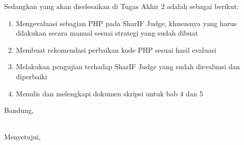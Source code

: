 \documentclass[a4paper,twoside]{article}
\begin{document}
	Sedangkan yang akan diselesaikan di Tugas Akhir 2 adalah sebagai berikut:
	\begin{enumerate}
		\item Mengevaluasi sebagian PHP pada SharIF Judge, khususnya yang harus dilakukan secara manual sesuai strategi yang sudah dibuat
		\item Membuat rekomendasi perbaikan kode PHP sesuai hasil evaluasi
		\item Melakukan pengujian terhadap SharIF Judge yang sudah dievaluasi dan diperbaiki
		\item Menulis dan melengkapi dokumen skripsi untuk bab 4 dan 5
		
	\end{enumerate}
	
	\vspace{1cm}
	\centering Bandung, \tanggal\\
	\vspace{2cm} \nama \\ 
	\vspace{1cm}
	
	Menyetujui, \\
\end{document}
